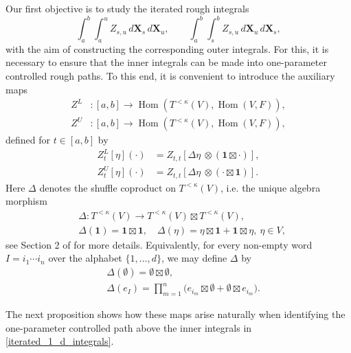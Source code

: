 \documentclass{article}%
\begin{document}
Our first objective is to study the iterated rough integrals 
\begin{equation}\label{iterated_1_d_integrals}
\int_a^b \int_a^u Z_{s, u}\, d\mathbf{X}_s \, d\mathbf{X}_u,
\qquad 
\int_a^b \int_s^b Z_{s, u}\, d\mathbf{X}_u \, d\mathbf{X}_s, 
\end{equation}
with the aim of constructing the corresponding outer integrals. For this, it is necessary to ensure that the inner integrals can be made into 
one-parameter controlled rough paths. To this end, it is convenient to introduce the auxiliary maps
\begin{align*}
Z^L &: [a,b] \to 
\operatorname{Hom}\!\left(
T^{< \kappa}(V),
\operatorname{Hom}(V, F)
\right), \\
Z^U &: [a,b] \to 
\operatorname{Hom}\!\left(
T^{< \kappa}(V),
\operatorname{Hom}(V, F)
\right),
\end{align*}
defined for \(t \in [a,b]\) by
\begin{align*}
Z^L_t[\eta](\cdot) &= Z_{t,t} \left[\Delta \eta\ \otimes ( \mathbf{1} \boxtimes \cdot)\right], \\
Z^U_t[\eta](\cdot) &= Z_{t,t} \left[\Delta \eta\ \otimes (\cdot \boxtimes  \mathbf{1})\right].
\end{align*}
Here \(\Delta\) denotes the shuffle coproduct on \(T^{<\kappa}(V)\), i.e. the unique algebra morphism
\begin{align*}
&\Delta:T^{<\kappa}(V)\to T^{<\kappa}(V)\boxtimes T^{<\kappa}(V),\\
&\Delta( \mathbf{1})= \mathbf{1}\boxtimes  \mathbf{1},\quad \Delta(\eta)=\eta\boxtimes  \mathbf{1}+ \mathbf{1}\boxtimes \eta, \ \eta\in V,
\end{align*}
see Section 2 of \cite{cass2022combinatorial} for more details.
Equivalently, for every non-empty word \(I=i_1\cdots i_n\) over the alphabet \(\{1,\dots,d\}\),
we may define \(\Delta\) by
\begin{align*}
&\Delta(\emptyset) = \emptyset \boxtimes \emptyset,\\\
&\Delta(e_{I})
=
\prod_{m=1}^n \bigl(e_{i_m}\boxtimes \emptyset +\emptyset\boxtimes e_{i_m}\bigr).    
\end{align*}


The next proposition shows how these maps arise naturally when identifying the one-parameter controlled path above the inner integrals in \eqref{iterated_1_d_integrals}.
\end{document}
